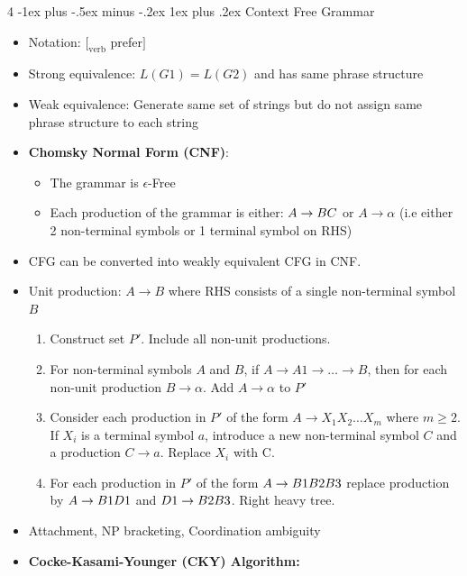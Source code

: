 \documentclass[10pt, landscape]{article}
\makeatletter
\renewcommand{\subsubsection}{\@startsection{subsubsection}{3}{0mm}%
  {-1ex plus -.5ex minus -.2ex}%
  {1ex plus .2ex}%
{\normalfont\small\bfseries}}%
\makeatother
\begin{document}
\begin{multicols*}{4}
  \subsubsection{Context Free Grammar}
  \begin{itemize}
    \item Notation: $[_{\text{verb}}$ prefer$]$
    \item Strong equivalence: $L(G1) = L(G2)$ and has same phrase structure
    \item Weak equivalence: Generate same set of strings but do not assign same phrase structure to each string
    \item \textbf{Chomsky Normal Form (CNF)}:
    \begin{itemize}
      \item The grammar is $\epsilon$-Free
      \item Each production of the grammar is either: $A \rightarrow B \space C$ or $A \rightarrow \alpha$ (i.e either 2 non-terminal symbols or 1 terminal symbol on RHS)  
    \end{itemize}
      \item CFG can be converted into weakly equivalent CFG in CNF.
      \item Unit production: $A \rightarrow B$ where RHS consists of a single non-terminal symbol $B$
      \begin{enumerate}
        \item Construct set $P'$. Include all non-unit productions.
        \item For non-terminal symbols $A$ and $B$, if $A \rightarrow A1 \rightarrow \dots \rightarrow B$, then for each non-unit production $B \rightarrow \alpha$. Add $A \rightarrow \alpha$ to $P'$
        \item Consider each production in $P'$ of the form $A \rightarrow X_1X_2 \dots X_m$ where $m \geq 2$. If $X_i$ is a terminal symbol $a$, introduce a new non-terminal symbol $C$ and a production $C \rightarrow a$. Replace $X_i$ with C.
        \item For each production in $P'$ of the form $A \rightarrow B1 \space B2 \space B3$ replace production by $A \rightarrow B1 \space D1$ and $D1 \rightarrow B2 \space B3$. Right heavy tree.
      \end{enumerate}
      \item Attachment, NP bracketing, Coordination ambiguity
    \item \textbf{Cocke-Kasami-Younger (CKY) Algorithm:}
    \begin{enumerate}

\end{enumerate}
\end{itemize}
\end{multicols*}
\end{document}
